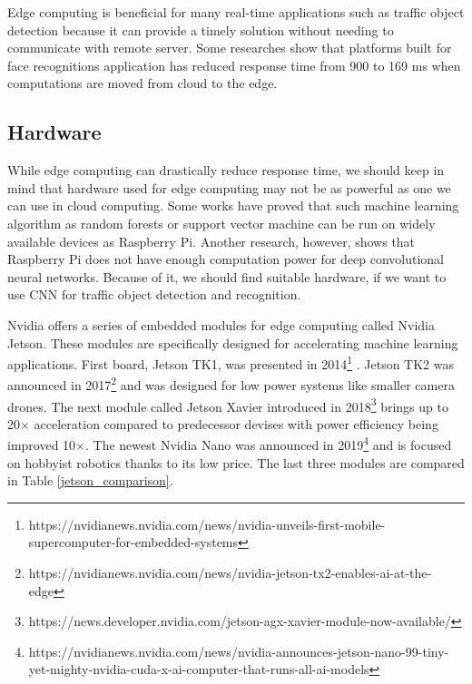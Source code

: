 \documentclass[twoside]{ctuthesis}
\theoremstyle{plain}
\theoremstyle{definition}
\theoremstyle{note}
\begin{document}
Edge computing is beneficial for many real-time applications such as traffic object detection because it can provide a timely solution without needing to communicate with remote server. Some researches \cite{yi_hao_qin_li_2015} show that platforms built for face recognitions application has reduced response time from 900 to 169 ms when computations are moved from cloud to the edge. 

\subsection{Hardware}
\label{section:nvidia_jetson}

While edge computing can drastically reduce response time, we should keep in mind that hardware used for edge computing may not be as powerful as one we can use in cloud computing. Some works have proved \cite{yazici_basurra_gaber_2018} that such machine learning algorithm as random forests or support vector machine can be run on widely available devices as Raspberry Pi. Another research\cite{ostby_2018}, however, shows that Raspberry Pi does not have enough computation power for deep convolutional neural networks. Because of it, we should find suitable hardware, if we want to use CNN for traffic object detection and recognition.

Nvidia offers a series of embedded modules for edge computing called Nvidia Jetson. These modules are specifically designed for accelerating machine learning applications. First board, Jetson TK1, was presented in 2014\footnote{https://nvidianews.nvidia.com/news/nvidia-unveils-first-mobile-supercomputer-for-embedded-systems}
. Jetson TK2 was announced in 2017\footnote{https://nvidianews.nvidia.com/news/nvidia-jetson-tx2-enables-ai-at-the-edge}
 and was designed for low power systems like smaller camera drones. The next module called Jetson Xavier introduced in 2018\footnote{https://news.developer.nvidia.com/jetson-agx-xavier-module-now-available/}
  brings up to 20$\times$ acceleration compared to predecessor devises with power efficiency being improved 10$\times$. The newest Nvidia Nano was announced in 2019\footnote{https://nvidianews.nvidia.com/news/nvidia-announces-jetson-nano-99-tiny-yet-mighty-nvidia-cuda-x-ai-computer-that-runs-all-ai-models}
   and is focused on hobbyist robotics thanks to its low price. The last three modules are compared in Table \ref{jetson_comparison}.
   
\end{document}
